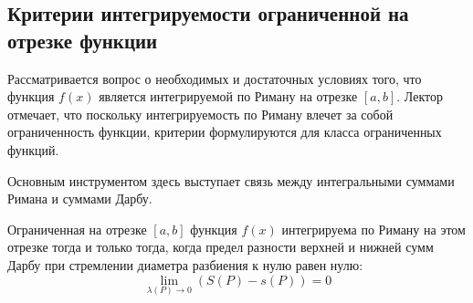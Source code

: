 \subsection{Критерии интегрируемости ограниченной на отрезке функции}

Рассматривается вопрос о необходимых и достаточных условиях того, что функция $f(x)$ является интегрируемой по Риману на отрезке $[a, b]$. Лектор отмечает, что поскольку интегрируемость по Риману влечет за собой ограниченность функции, критерии формулируются для класса ограниченных функций.

Основным инструментом здесь выступает связь между интегральными суммами Римана и суммами Дарбу.

\begin{theorem}
Ограниченная на отрезке $[a, b]$ функция $f(x)$ интегрируема по Риману на этом отрезке тогда и только тогда, когда предел разности верхней и нижней сумм Дарбу при стремлении диаметра разбиения к нулю равен нулю:
\[ \lim_{\lambda(P) \to 0} (S(P) - s(P)) = 0 \]
\end{theorem}

